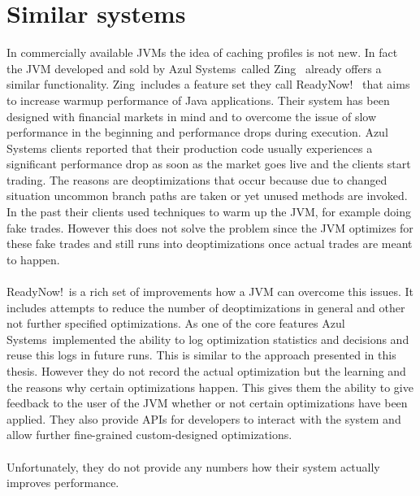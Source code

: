 \section{Similar systems}
\label{s:similarsystems}
In commercially available JVMs the idea of caching profiles is not new.
In fact the JVM developed and sold by Azul Systems\textregistered\ called Zing\textregistered\ \cite{zing} already offers a similar functionality.
Zing\textregistered\ includes a feature set they call ReadyNow!\texttrademark\ \cite{readynow} that aims to increase warmup performance of Java applications.
Their system has been designed with financial markets in mind and to overcome the issue of slow performance in the beginning and performance drops during execution.
Azul Systems clients reported that their production code usually experiences a significant performance drop as soon as the market goes live and the clients start trading.
The reasons are deoptimizations that occur because due to changed situation uncommon branch paths are taken or yet unused methods are invoked.
In the past their clients used techniques to warm up the JVM, for example doing fake trades. However this does not solve the problem since the JVM optimizes for these fake trades and still runs into deoptimizations once actual trades are meant to happen.
\\\\
ReadyNow!\texttrademark\  is a rich set of improvements how a JVM can overcome this issues. It includes attempts to reduce the number of deoptimizations in general and other not further specified optimizations.
As one of the core features Azul Systems\textregistered\ implemented the ability to log optimization statistics and decisions and reuse this logs in future runs. This is similar to the approach presented in this thesis. However they do not record the actual optimization but the learning and the reasons why certain optimizations happen. This gives them the ability to give feedback to the user of the JVM whether or not certain optimizations have been applied. They also provide APIs for developers to interact with the system and allow further fine-grained custom-designed optimizations.
\\\\
Unfortunately, they do not provide any numbers how their system actually improves performance.
